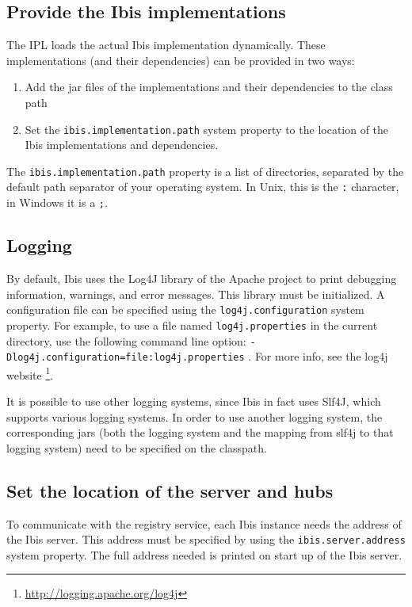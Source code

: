 \documentclass[a4paper,10pt]{article}
\begin{document}
\subsection{Provide the Ibis implementations}

The IPL loads the actual Ibis implementation dynamically. 
These implementations (and their dependencies) can be provided in two 
ways:

\begin{enumerate} 
\item Add the jar files of the implementations and their dependencies to
      the class path 
\item Set the \texttt{ibis.implementation.path} system property to the
      location of the Ibis implementations and dependencies.  
\end{enumerate}

The \texttt{ibis.implementation.path} property is a list of directories,
separated by the default path separator of your operating system. In
Unix, this is the \texttt{:} character, in Windows it is a \texttt{;}.

\subsection{Logging}

By default, Ibis uses the Log4J library of the Apache project to print
debugging information, warnings, and error messages. This library must be
initialized. A configuration file can be specified using the
\texttt{log4j.configuration} system property. For example, to use a file
named \texttt{log4j.properties} in the current directory, use the
following command line option:
\texttt{-Dlog4j.configuration=file:log4j.properties} . For more info,
see the log4j website \footnote{\url{http://logging.apache.org/log4j}}.

It is possible to use other logging systems, since Ibis in fact uses
Slf4J, which supports various logging systems. In order to use another
logging system, the corresponding jars (both the logging system and the
mapping from slf4j to that logging system) need to be specified on the
classpath.

\subsection{Set the location of the server and hubs}

To communicate with the registry service, each Ibis instance needs the address 
of the Ibis server. This address must be specified by using the 
\texttt{ibis.server.address} system property. The full address needed is 
printed on start up of the Ibis server. 
\end{document}
